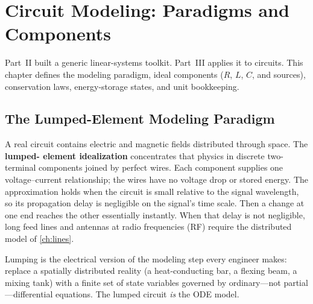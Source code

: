\chapter{Circuit Modeling: Paradigms and Components}
\label{ch:foundations}
Part~II built a generic linear-systems toolkit. Part~III applies it to circuits.
This chapter defines the modeling paradigm, ideal components (\(R\), \(L\), \(C\),
and sources), conservation laws, energy-storage states, and unit bookkeeping.

\section{The Lumped-Element Modeling Paradigm}
A real circuit contains electric and magnetic fields distributed through space. The \textbf{lumped-
element idealization} concentrates that physics in discrete two-terminal
components joined by perfect wires. Each component supplies one voltage--current
relationship; the wires have no voltage drop or stored energy. The approximation
holds when the circuit is small relative to the signal wavelength, so its
propagation delay is negligible on the signal's time scale. Then a change at one
end reaches the other essentially instantly. When that delay is not negligible,
long feed lines and antennas at radio frequencies (RF) require the distributed
model of \cref{ch:lines}.
\cite[pp.~22--23, 79--80]{white2004highfrequency}

\begin{controlsbox}
Lumping is the electrical version of the modeling step every engineer makes:
replace a spatially distributed reality (a heat-conducting bar, a flexing beam,
a mixing tank) with a finite set of state variables governed by ordinary---not
partial---differential equations. The lumped circuit \emph{is} the ODE model.
\end{controlsbox}

